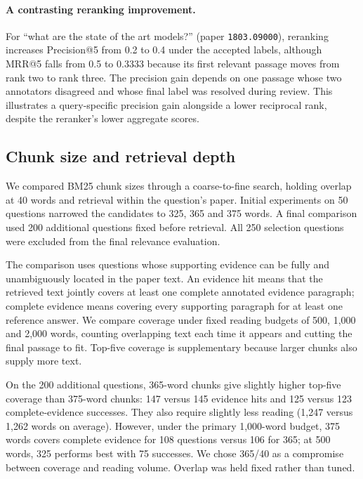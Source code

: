 \paragraph{A contrasting reranking improvement.}
For ``what are the state of the art models?'' (paper \texttt{1803.09000}), reranking increases Precision@5 from 0.2 to 0.4 under the accepted labels, although MRR@5 falls from 0.5 to 0.3333 because its first relevant passage moves from rank two to rank three. The precision gain depends on one passage whose two annotators disagreed and whose final label was resolved during review. This illustrates a query-specific precision gain alongside a lower reciprocal rank, despite the reranker's lower aggregate scores.


\subsection{Chunk size and retrieval depth}
We compared BM25 chunk sizes through a coarse-to-fine search, holding overlap at 40 words and retrieval within the question's paper. Initial experiments on 50 questions narrowed the candidates to 325, 365 and 375 words. A final comparison used 200 additional questions fixed before retrieval. All 250 selection questions were excluded from the final relevance evaluation.

The comparison uses questions whose supporting evidence can be fully and unambiguously located in the paper text. An evidence hit means that the retrieved text jointly covers at least one complete annotated evidence paragraph; complete evidence means covering every supporting paragraph for at least one reference answer. We compare coverage under fixed reading budgets of 500, 1,000 and 2,000 words, counting overlapping text each time it appears and cutting the final passage to fit. Top-five coverage is supplementary because larger chunks also supply more text.

On the 200 additional questions, 365-word chunks give slightly higher top-five coverage than 375-word chunks: 147 versus 145 evidence hits and 125 versus 123 complete-evidence successes. They also require slightly less reading (1,247 versus 1,262 words on average). However, under the primary 1,000-word budget, 375 words covers complete evidence for 108 questions versus 106 for 365; at 500 words, 325 performs best with 75 successes. We chose 365/40 as a compromise between coverage and reading volume. Overlap was held fixed rather than tuned.

